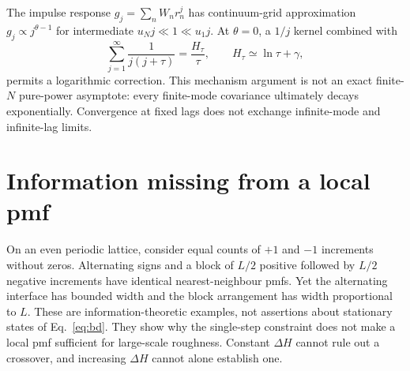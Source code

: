 The impulse response $g_j=\sum_nW_nr_n^j$ has continuum-grid approximation
$g_j\propto j^{\theta-1}$ for intermediate $u_Nj\ll1\ll u_1j$. At
$\theta=0$, a $1/j$ kernel combined with
\begin{equation}
 \sum_{j=1}^{\infty}\frac1{j(j+\tau)}=
 \frac{H_\tau}{\tau},\qquad H_\tau\simeq\ln\tau+\gamma,
\end{equation}
permits a logarithmic correction. This mechanism argument is not an exact
finite-$N$ pure-power asymptote: every finite-mode covariance ultimately
decays exponentially. Convergence at fixed lags does not exchange infinite-mode
and infinite-lag limits.

\section{Information missing from a local pmf}
\label{app:local}
On an even periodic lattice, consider equal counts of $+1$ and $-1$ increments
without zeros. Alternating signs and a block of $L/2$ positive followed by
$L/2$ negative increments have identical nearest-neighbour pmfs. Yet the
alternating interface has bounded width and the block arrangement has width
proportional to $L$. These are information-theoretic examples, not assertions
about stationary states of Eq.~\eqref{eq:bd}. They show why the single-step
constraint does not make a local pmf sufficient for large-scale roughness.
Constant $\Delta H$ cannot rule out a crossover, and increasing $\Delta H$
cannot alone establish one.

\FloatBarrier


